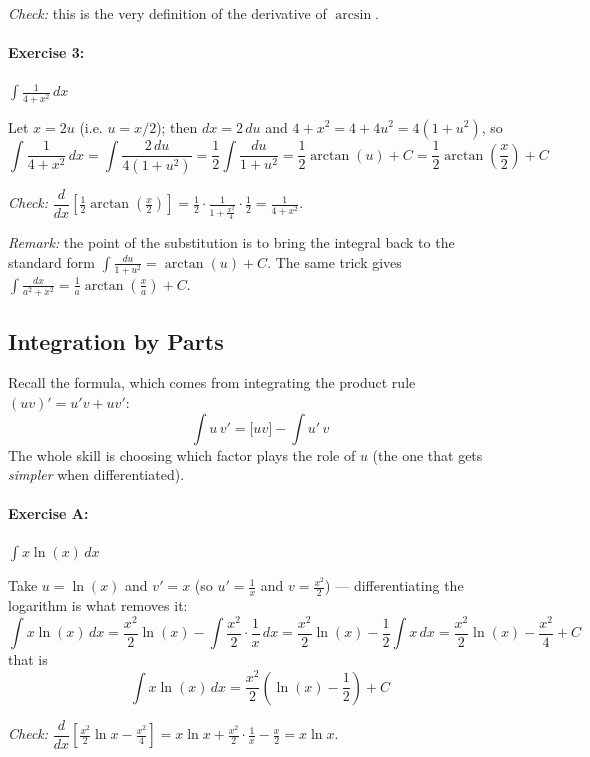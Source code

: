 \documentclass[]{article}
\begin{document}
	\textit{Check:} this is the very definition of the derivative of $\arcsin$. \checkmark

	\paragraph{Exercise 3:} $\displaystyle \int \frac{1}{4+x^2}\,dx$

	Let $x = 2u$ (i.e. $u = x/2$); then $dx = 2\,du$ and $4 + x^2 = 4 + 4u^2 = 4\left(1+u^2\right)$, so
	$$
	\int \frac{1}{4+x^2}\,dx
	= \int \frac{2\,du}{4\left(1+u^2\right)}
	= \frac{1}{2} \int \frac{du}{1+u^2}
	= \frac{1}{2}\arctan(u) + C
	= \frac{1}{2}\arctan\left(\frac{x}{2}\right) + C
	$$

	\textit{Check:} $\dfrac{d}{dx}\left[\frac{1}{2}\arctan\left(\frac{x}{2}\right)\right] = \frac{1}{2}\cdot\frac{1}{1+\frac{x^2}{4}}\cdot\frac{1}{2} = \frac{1}{4+x^2}$. \checkmark

	\textit{Remark:} the point of the substitution is to bring the integral back to the standard form $\int \frac{du}{1+u^2} = \arctan(u) + C$.
	The same trick gives $\int \frac{dx}{a^2+x^2} = \frac{1}{a}\arctan\left(\frac{x}{a}\right) + C$.

	\subsection*{Integration by Parts}

	Recall the formula, which comes from integrating the product rule $(uv)' = u'v + uv'$:
	$$
	\int u \, v' = \Big[ u v \Big] - \int u' \, v
	$$
	The whole skill is choosing which factor plays the role of $u$ (the one that gets \textit{simpler} when differentiated).

	\paragraph{Exercise A:} $\displaystyle \int x \ln(x)\,dx$

	Take $u = \ln(x)$ and $v' = x$ (so $u' = \frac{1}{x}$ and $v = \frac{x^2}{2}$) --- differentiating the logarithm is what removes it:
	$$
	\int x \ln(x)\,dx
	= \frac{x^2}{2}\ln(x) - \int \frac{x^2}{2} \cdot \frac{1}{x}\,dx
	= \frac{x^2}{2}\ln(x) - \frac{1}{2}\int x \,dx
	= \frac{x^2}{2}\ln(x) - \frac{x^2}{4} + C
	$$
	that is
	$$
	\int x \ln(x)\,dx = \frac{x^2}{2}\left( \ln(x) - \frac{1}{2} \right) + C
	$$

	\textit{Check:} $\dfrac{d}{dx}\left[\frac{x^2}{2}\ln x - \frac{x^2}{4}\right] = x\ln x + \frac{x^2}{2}\cdot\frac{1}{x} - \frac{x}{2} = x \ln x$. \checkmark
\end{document}
